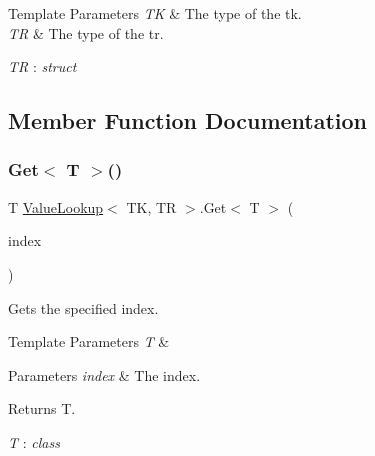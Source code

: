 \begin{DoxyTemplParams}{Template Parameters}
{\em TK} & The type of the tk.\\
\hline
{\em TR} & The type of the tr.\\
\hline
\end{DoxyTemplParams}
\begin{Desc}
\item[Type Constraints]\begin{description}
\item[{\em TR} : {\em struct}]\end{description}
\end{Desc}


\subsection{Member Function Documentation}
\mbox{\label{class_value_lookup_a14914a625a7b67b09a3a1fc19d81e95c}} 
\subsubsection{\texorpdfstring{Get$<$ T $>$()}{Get< T >()}}
{\footnotesize\ttfamily T \hyperlink{class_value_lookup}{Value\+Lookup}$<$ TK, TR $>$.Get$<$ T $>$ (\begin{DoxyParamCaption}\item[{TK}]{index }\end{DoxyParamCaption})\hspace{0.3cm}{\ttfamily [inline]}}



Gets the specified index. 


\begin{DoxyTemplParams}{Template Parameters}
{\em T} & \\
\hline
\end{DoxyTemplParams}

\begin{DoxyParams}{Parameters}
{\em index} & The index.\\
\hline
\end{DoxyParams}
\begin{DoxyReturn}{Returns}
T.
\end{DoxyReturn}
\begin{Desc}
\item[Type Constraints]\begin{description}
\item[{\em T} : {\em class}]\end{description}
\end{Desc}



